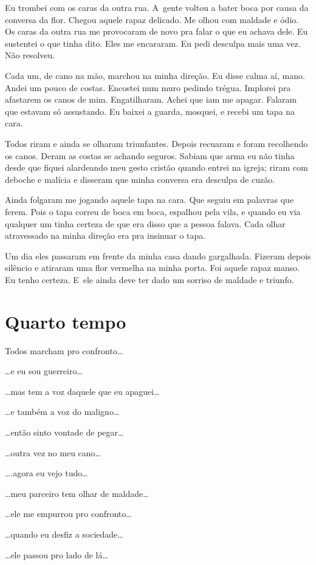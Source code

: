 Eu trombei com os caras da outra rua. A~gente voltou a bater boca por
causa da conversa da flor. Chegou aquele rapaz delicado. Me olhou com
maldade e ódio. Os caras da outra rua me provocaram de novo pra falar o
que eu achava dele. Eu sustentei o que tinha dito. Eles me encararam. Eu
pedi desculpa mais uma vez. Não resolveu.

Cada um, de cano na mão, marchou na minha direção. Eu disse calma aí,
mano. Andei um pouco de costas. Encostei num muro pedindo trégua.
Implorei pra afastarem os canos de mim. Engatilharam. Achei que iam me
apagar. Falaram que estavam só assustando. Eu baixei a guarda, mosquei,
e recebi um tapa na cara.

Todos riram e ainda se olharam triunfantes. Depois recuaram e foram
recolhendo os canos. Deram as costas se achando seguros. Sabiam que arma
eu não tinha desde que fiquei alardeando meu gesto cristão quando entrei
na igreja; riram com deboche e malícia e disseram que minha conversa era
desculpa de cuzão.

Ainda folgaram me jogando aquele tapa na cara. Que seguiu em palavras
que ferem. Pois o tapa correu de boca em boca, espalhou pela vila, e
quando eu via qualquer um tinha certeza de que era disso que a pessoa
falava. Cada olhar atravessado na minha direção era pra insinuar o tapa.

Um dia eles passaram em frente da minha casa dando gargalhada. Fizeram
depois silêncio e atiraram uma flor vermelha na minha porta. Foi aquele
rapaz manso. Eu tenho certeza. E~ele ainda deve ter dado um sorriso de
maldade e triunfo.

\section{Quarto tempo}

Todos marcham pro confronto…

…e eu sou guerreiro…

…mas tem a voz daquele que eu apaguei…

…e também a voz do maligno…

…então sinto vontade de pegar…

…outra vez no meu cano…

….agora eu vejo tudo…

…meu parceiro tem olhar de maldade…

…ele me empurrou pro confronto…

…quando eu desfiz a sociedade…

…ele passou pro lado de lá…

